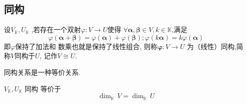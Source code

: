 \subsection{同构}
\begin{formal}
\begin{definition}[线性同构]\label{def:线性同构}
    设$V_{\mathbb{K}},U_{\mathbb{K}}$
    ,若存在一个双射$\varphi
    : V \longrightarrow U$使得
    $\forall \bm{\alpha},\bm{\beta}
     \in V,k \in \mathbb{K}$,满足
     \[
     \varphi \left(\bm{\alpha}
     +\bm{\beta}
     \right) =
     \varphi \left(\bm{\alpha}
     \right)+\varphi \left(
        \bm{\beta}
     \right);
     \varphi \left(k\bm{\alpha}
     \right)=k\varphi \left(
        \bm{\alpha}
     \right)
     \]
     即$\varphi $保持了加法和
     数乘也就是保持了线性组合,
     则称$\bm{\varphi}:V\longrightarrow U$
     为（线性）同构,简称$V$同构于$U$,
     记作$V\cong U$.
\end{definition}
\end{formal}
\begin{formal}
\begin{theorem}[线性同构的关系]\label{thm:线性同构的关系}
    同构关系是一种等价关系.
\end{theorem}
\end{formal}
\begin{formal}
\begin{theorem}[同构判定]\label{thm:同构判定}
    $V_{\mathbb{K}},U_{\mathbb{K}}$
    同构
等价于
    \[
    \dim_{\mathbb{K}}\,V
    = \dim_{\mathbb{K}}\,U
    \]
\end{theorem}
\end{formal}
